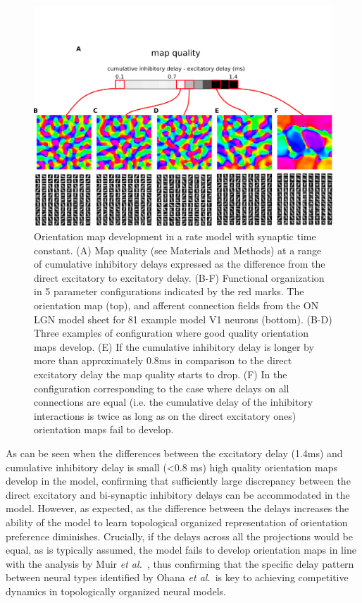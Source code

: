 \documentclass[a4paper,10pt]{article}
\newcommand{\etal}{\textit{et al.}}
\begin{document}
\begin{figure}[htpb!] 
\centering
\includegraphics[width=16cm]{./SVG/Figure4/figure4.png}
\caption{Orientation map development in a rate model with synaptic time constant. (A) Map quality (see Materials and Methods) at a range of 
cumulative inhibitory delays expressed as the difference from the direct excitatory to excitatory delay. (B-F) Functional organization in 5 parameter configurations 
indicated by the red marks. The orientation map (top), and afferent connection fields from the ON LGN model sheet for 81 example model V1 neurons (bottom). 
(B-D) Three examples of configuration where good quality orientation maps develop. (E) If the cumulative inhibitory delay is longer by more than approximately 0.8ms in comparison
to the direct excitatory delay the map quality starts to drop. (F) In the configuration corresponding to the case where delays on all connections are equal (i.e. the cumulative delay
of the inhibitory interactions is twice as long as on the direct excitatory ones) orientation maps fail to develop.}
\label{fig:figure4}
\end{figure} 

As can be seen when the differences between the excitatory delay (1.4ms) and cumulative inhibitory delay is small (\textless 0.8 ms) high quality orientation maps develop in the model, confirming that sufficiently 
large discrepancy between the direct excitatory and bi-synaptic inhibitory delays can be accommodated in the model. However, as expected, as the difference between the delays increases the ability of the model to learn topological organized representation of orientation preference diminishes. Crucially, if the delays across all the projections would be equal, as is typically assumed, the model fails to develop orientation maps in line with the analysis by Muir \etal \, \cite{Muir2014}, thus confirming that the specific delay pattern between neural types identified by Ohana \etal \, \cite{Ohana2012} is key to achieving competitive dynamics in topologically organized neural models.
\end{document}
